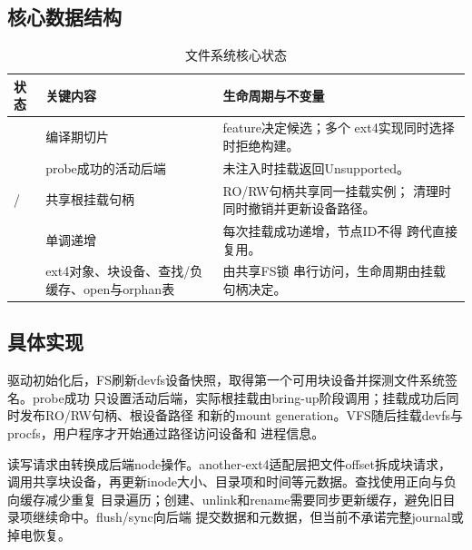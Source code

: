 \subsection{核心数据结构}

\begin{table}[htbp]
  \centering
  \caption{文件系统核心状态}
  \begin{tabularx}{\textwidth}{L{3.4cm}L{4.8cm}Y}
    \toprule
    状态 & 关键内容 & 生命周期与不变量 \\
    \midrule
     & 编译期切片 & feature决定候选；多个
    ext4实现同时选择时拒绝构建。\\
     & probe成功的活动后端 & 未注入时挂载返回Unsupported。\\
     & 共享根挂载句柄 & RO/RW句柄共享同一挂载实例；
    清理时同时撤销并更新设备路径。\\
     & 单调递增 & 每次挂载成功递增，节点ID不得
    跨代直接复用。\\
     & ext4对象、块设备、查找/负缓存、open与orphan表 & 由共享FS锁
    串行访问，生命周期由挂载句柄决定。\\
    \bottomrule
  \end{tabularx}
\end{table}

\subsection{具体实现}

驱动初始化后，FS刷新devfs设备快照，取得第一个可用块设备并探测文件系统签名。probe成功
只设置活动后端，实际根挂载由bring-up阶段调用；挂载成功后同时发布RO/RW句柄、根设备路径
和新的mount generation。VFS随后挂载devfs与procfs，用户程序才开始通过路径访问设备和
进程信息。

读写请求由转换成后端node操作。another-ext4适配层把文件offset拆成块请求，
调用共享块设备，再更新inode大小、目录项和时间等元数据。查找使用正向与负向缓存减少重复
目录遍历；创建、unlink和rename需要同步更新缓存，避免旧目录项继续命中。flush/sync向后端
提交数据和元数据，但当前不承诺完整journal或掉电恢复。

